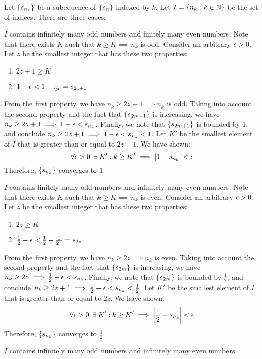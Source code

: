 \documentclass[11pt,letterpaper]{article}
\begin{document}
\begin{Problem}{3.4}
\begin{Proof}
Let $\left\{ s_{n_k} \right\}$ be a subequence of $\left\{ s_n \right\}$ indexed by $k$. Let $I=\left\{ n_k : k\in\mathbb{N} \right\}$ be the set of indices. There are three cases:
\begin{Case}{1}{$I$ contains infinitely many odd numbers and finitely many even numbers.}
    Note that there exists $K$ such that $k \geq K \implies n_k$ is odd. Consider an arbitrary $\epsilon>0$. Let $z$ be the smallest integer that has these two properties:
    \begin{enumerate}
        \item $2z+1 \geq K$
        \item $1-\epsilon < 1-\frac{1}{2^z} = s_{2z+1}$
    \end{enumerate}
    From the first property, we have $n_k \geq 2z+1 \implies n_k$ is odd. Taking into account the second property and the fact that $\left\{ s_{2m+1} \right\}$ is increasing, we have $n_k \geq 2z+1 \implies 1-\epsilon < s_{n_k}$. Finally, we note that $\left\{ s_{2m+1} \right\}$ is bounded by 1, and conclude $n_k \geq 2z+1 \implies 1-\epsilon < s_{n_k} < 1$. Let $K'$ be the smallest element of $I$ that is greater than or equal to $2z+1$. We have shown:
    \[ \forall \epsilon>0 \,\,\,\exists\, K' : k \geq K' \implies |1-s_{n_k}|<\epsilon \]
    Therefore, $\left\{ s_{n_k} \right\}$ converges to 1. 
\end{Case}
\begin{Case}{2}{$I$ contains finitely many odd numbers and infinitely many even numbers.}
    Note that there exists $K$ such that $k \geq K \implies n_k$ is even. Consider an arbitrary $\epsilon>0$. Let $z$ be the smallest integer that has these two properties:
    \begin{enumerate}
        \item $2z \geq K$
        \item $\frac{1}{2}-\epsilon < \frac{1}{2}-\frac{1}{2^z} = s_{2z}$
    \end{enumerate}
    From the first property, we have $n_k \geq 2z \implies n_k$ is even. Taking into account the second property and the fact that $\left\{ s_{2m} \right\}$ is increasing, we have $n_k \geq 2z \implies \frac{1}{2}-\epsilon < s_{n_k}$. Finally, we note that $\left\{ s_{2m} \right\}$ is bounded by $\frac{1}{2}$, and conclude $n_k \geq 2z+1 \implies \frac{1}{2}-\epsilon < s_{n_k} < \frac{1}{2}$. Let $K'$ be the smallest element of $I$ that is greater than or equal to $2z$. We have shown:
    \[ \forall \epsilon>0 \,\,\,\exists\, K' : k \geq K' \implies \left| \frac{1}{2}-s_{n_k} \right|<\epsilon \]
    Therefore, $\left\{ s_{n_k} \right\}$ converges to $\frac{1}{2}$. 
\end{Case}
\begin{Case}{3}{$I$ contains infinitely many odd numbers and infinitely many even numbers.}

\end{Case}
\end{Proof}
\end{Problem}
\end{document}
